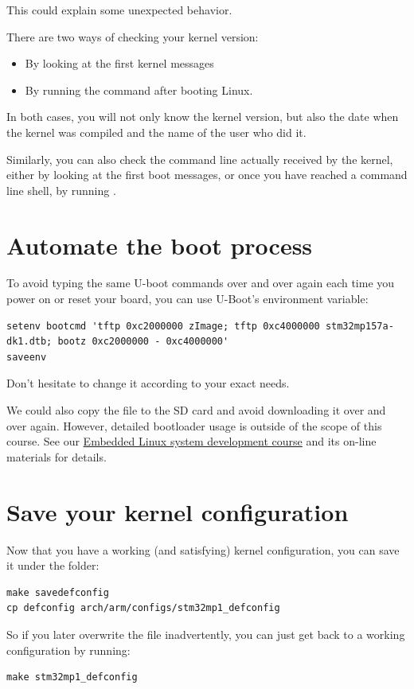 This could explain some unexpected behavior.

There are two ways of checking your kernel version:
\begin{itemize}
\item By looking at the first kernel messages
\item By running the  command after booting Linux.
\end{itemize}

In both cases, you will not only know the kernel version, but also
the date when the kernel was compiled and the name of the user who
did it.

Similarly, you can also check the command line actually received by
the kernel, either by looking at the first boot messages, or once you
have reached a command line shell, by running .

\section{Automate the boot process}

To avoid typing the same U-boot commands over and over again each time
you power on or reset your board, you can use U-Boot's 
environment variable:

{\footnotesize
\begin{verbatim}
setenv bootcmd 'tftp 0xc2000000 zImage; tftp 0xc4000000 stm32mp157a-dk1.dtb; bootz 0xc2000000 - 0xc4000000'
saveenv
\end{verbatim}
}

Don't hesitate to change it according to your exact needs.

We could also copy the  file to the SD card and avoid
downloading it over and over again. However, detailed bootloader
usage is outside of the scope of this course. See our
\href{https://bootlin.com/training/embedded-linux/}{Embedded
Linux system development course} and its on-line materials for
details.

\section{Save your kernel configuration}

Now that you have a working (and satisfying) kernel configuration, you
can save it under the  folder:

\begin{verbatim}
make savedefconfig
cp defconfig arch/arm/configs/stm32mp1_defconfig
\end{verbatim}

So if you later overwrite the  file inadvertently, you can
just get back to a working configuration by running:

\begin{verbatim}
make stm32mp1_defconfig
\end{verbatim}
